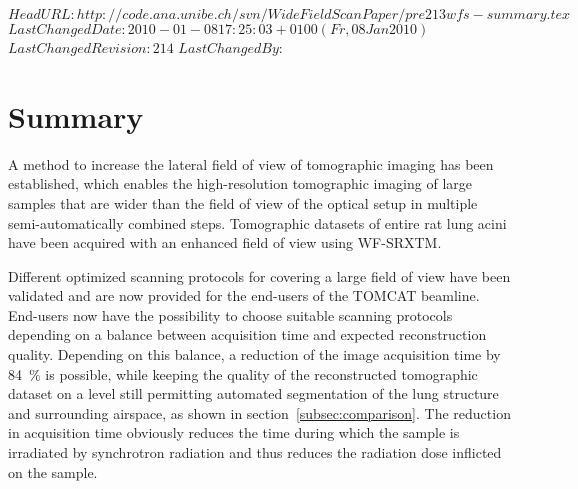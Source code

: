 \svnidlong
{$HeadURL: http://code.ana.unibe.ch/svn/WideFieldScanPaper/pre213wfs-summary.tex $}
{$LastChangedDate: 2010-01-08 17:25:03 +0100 (Fr, 08 Jan 2010) $}
{$LastChangedRevision: 214 $}
{$LastChangedBy: $}
%
\section{Summary}\label{summary}

A method to increase the lateral field of view of tomographic imaging has been established, which enables the high-resolution tomographic imaging of large samples that are wider than the field of view of the optical setup in multiple semi-automatically combined steps. Tomographic datasets of entire rat lung acini have been acquired with an enhanced field of view using WF-SRXTM.

Different optimized scanning protocols for covering a large field of view have been validated and are now provided for the end-users of the TOMCAT beamline. End-users now have the possibility to choose suitable scanning protocols depending on a balance between acquisition time and expected reconstruction quality. Depending on this balance, a reduction of the image acquisition time by \SI{84}{\percent} is possible, while keeping the quality of the reconstructed tomographic dataset on a level still permitting automated segmentation of the lung structure and surrounding airspace, as shown in section~\ref{subsec:comparison}. The reduction in acquisition time obviously reduces the time during which the sample is irradiated by synchrotron radiation and thus reduces the radiation dose inflicted on the sample.